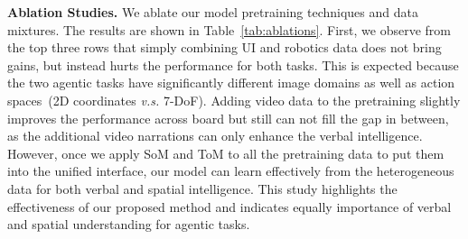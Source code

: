 \begin{table}[t]
\vspace{-4pt}
    \centering
    \vspace{-10pt}
    \caption{Ablation study on the effect of data mixtures and pretraining techniques. w/o SoM+Tom means using original action supervisions~(2D coordinates for UI and 7DoF for robots.)}
\label{tab:ablations}
    \vspace{-8pt}
\end{table}

\noindent\textbf{Ablation Studies.} We ablate our model pretraining techniques and data mixtures. The results are shown in Table~\ref{tab:ablations}. First, we observe from the top three rows that simply combining UI and robotics data does not bring gains, but instead hurts the performance for both tasks. This is expected because the two agentic tasks have significantly different image domains as well as action spaces~(2D coordinates \textit{v.s.} 7-DoF). Adding video data to the pretraining slightly improves the performance across board but still can not fill the gap in between, as the additional video narrations can only enhance the verbal intelligence. However, once we apply SoM and ToM to all the pretraining data to put them into the unified interface, our model can learn effectively from the heterogeneous data for both verbal and spatial intelligence. This study highlights the effectiveness of our proposed method and indicates equally importance of verbal and spatial understanding for agentic tasks.

